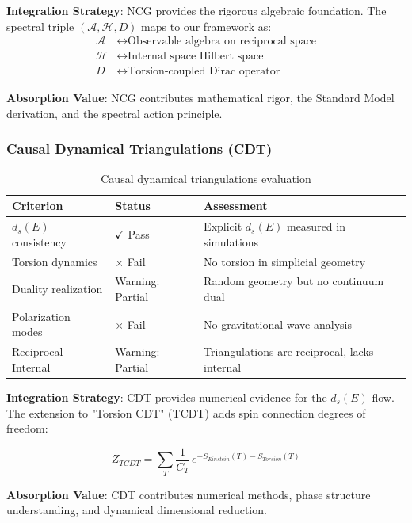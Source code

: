 \textbf{Integration Strategy}:
NCG provides the rigorous algebraic foundation. The spectral triple $(\mathcal{A}, \mathcal{H}, D)$ maps to our framework as:
\begin{align}
    \mathcal{A} &\leftrightarrow \text{Observable algebra on reciprocal space} \\
    \mathcal{H} &\leftrightarrow \text{Internal space Hilbert space} \\
    D &\leftrightarrow \text{Torsion-coupled Dirac operator}
\end{align}

\textbf{Absorption Value}: NCG contributes mathematical rigor, the Standard Model derivation, and the spectral action principle.

\subsubsection{Causal Dynamical Triangulations (CDT)}

\begin{table}[h]
\centering
\begin{tabular}{p{3.5cm}p{2cm}p{6cm}}
\toprule
\textbf{Criterion} & \textbf{Status} & \textbf{Assessment} \\
\midrule
$d_s(E)$ consistency & $\checkmark$ Pass & Explicit $d_s(E)$ measured in simulations \\
Torsion dynamics & $\times$ Fail & No torsion in simplicial geometry \\
Duality realization & Warning: Partial & Random geometry but no continuum dual \\
Polarization modes & $\times$ Fail & No gravitational wave analysis \\
Reciprocal-Internal & Warning: Partial & Triangulations are reciprocal, lacks internal \\
\bottomrule
\end{tabular}
\caption{Causal dynamical triangulations evaluation}
\end{table}

\textbf{Integration Strategy}:
CDT provides numerical evidence for the $d_s(E)$ flow. The extension to "Torsion CDT" (TCDT) adds spin connection degrees of freedom:

\begin{equation}
    Z_{TCDT} = \sum_{T} \frac{1}{C_T} \, e^{-S_{Einstein}(T) - S_{Torsion}(T)}
\end{equation}

\textbf{Absorption Value}: CDT contributes numerical methods, phase structure understanding, and dynamical dimensional reduction.

